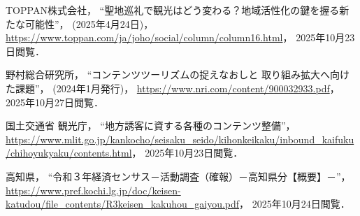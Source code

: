 \documentclass{docs}
\begin{document}
\begin{thebibliography}{99}
    TOPPAN株式会社，
    “聖地巡礼で観光はどう変わる？地域活性化の鍵を握る新たな可能性”，
    (2025年4月24日)，
    \url{https://www.toppan.com/ja/joho/social/column/column16.html}，
    2025年10月23日閲覧．

    野村総合研究所，
    “コンテンツツーリズムの捉えなおしと 取り組み拡大へ向けた課題”，
    (2024年1月発行)，
    \url{https://www.nri.com/content/900032933.pdf}，
    2025年10月27日閲覧．

    国土交通省 観光庁，
    “地方誘客に資する各種のコンテンツ整備”，
    \url{https://www.mlit.go.jp/kankocho/seisaku_seido/kihonkeikaku/inbound_kaifuku/chihoyukyaku/contents.html}，
    2025年10月23日閲覧．

    高知県，
    “令和３年経済センサス－活動調査（確報）－高知県分【概要】－”，
    \url{https://www.pref.kochi.lg.jp/doc/keisen-katudou/file_contents/R3keisen_kakuhou_gaiyou.pdf}，
    2025年10月24日閲覧．
\end{thebibliography}
\end{document}
